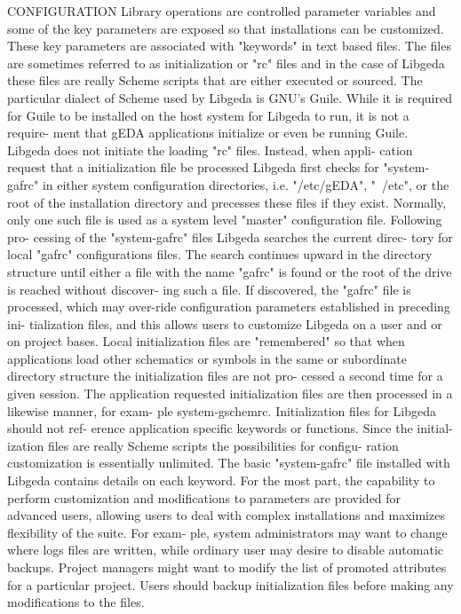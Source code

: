 CONFIGURATION
       Library  operations  are controlled parameter variables and some of the
       key parameters are exposed so that  installations  can  be  customized.
       These  key  parameters  are  associated  with  "keywords" in text based
       files. The files are sometimes referred to as  initialization  or  "rc"
       files  and in the case of Libgeda these files are really Scheme scripts
       that are either executed or sourced.  The  particular dialect of Scheme
       used  by  Libgeda  is GNU's Guile. While it is required for Guile to be
       installed on the host system for Libgeda to run, it is not  a  require-
       ment  that  gEDA  applications  initialize  or  even  be running Guile.
       Libgeda does not initiate the loading "rc" files. Instead, when  appli-
       cation  request  that  a initialization file be processed Libgeda first
       checks for "system-gafrc" in either system  configuration  directories,
       i.e.  "/etc/gEDA",  "~/etc",  or the root of the installation directory
       and precesses these files if they exist. Normally, only one  such  file
       is  used  as a system level "master" configuration file. Following pro-
       cessing of the "system-gafrc" files Libgeda searches the current direc-
       tory  for  local  "gafrc"  configurations  files.  The search continues
       upward in the directory structure until either a  file  with  the  name
       "gafrc"  is found or the root of the drive is reached without discover-
       ing such a file. If discovered, the "gafrc" file  is  processed,  which
       may  over-ride  configuration  parameters established in preceding ini-
       tialization files, and this allows users to customize Libgeda on a user
       and or on project bases. Local initialization files are "remembered" so
       that when applications load other schematics or symbols in the same  or
       subordinate  directory  structure the initialization files are not pro-
       cessed a second time for a given  session.  The  application  requested
       initialization files are then processed in a likewise manner, for exam-
       ple system-gschemrc.  Initialization files for Libgeda should not  ref-
       erence  application  specific keywords or functions. Since the initial-
       ization files are really Scheme scripts the possibilities for  configu-
       ration customization is essentially unlimited. The basic "system-gafrc"
       file installed with Libgeda contains details on each keyword.  For  the
       most part, the capability to perform customization and modifications to
       parameters are provided for advanced users, allowing users to deal with
       complex installations and maximizes flexibility of the suite. For exam-
       ple, system administrators may want to  change  where  logs  files  are
       written,  while  ordinary user may desire to disable automatic backups.
       Project managers might want to modify the list of  promoted  attributes
       for  a  particular  project.  Users  should backup initialization files
       before making any modifications to the files.


